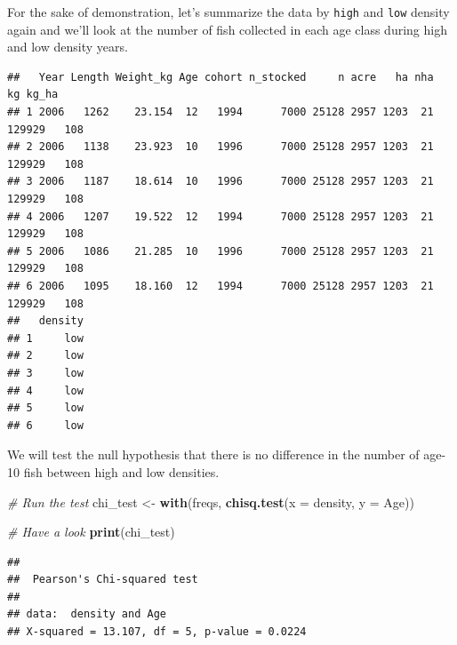 \documentclass[
]{book}
\newenvironment{Shaded}{\begin{snugshade}}{\end{snugshade}}
\newcommand{\CommentTok}[1]{\textcolor[rgb]{0.56,0.35,0.01}{\textit{#1}}}
\newcommand{\DataTypeTok}[1]{\textcolor[rgb]{0.13,0.29,0.53}{#1}}
\newcommand{\DecValTok}[1]{\textcolor[rgb]{0.00,0.00,0.81}{#1}}
\newcommand{\KeywordTok}[1]{\textcolor[rgb]{0.13,0.29,0.53}{\textbf{#1}}}
\newcommand{\NormalTok}[1]{#1}
\newcommand{\OperatorTok}[1]{\textcolor[rgb]{0.81,0.36,0.00}{\textbf{#1}}}
\newcommand{\StringTok}[1]{\textcolor[rgb]{0.31,0.60,0.02}{#1}}
\begin{document}
For the sake of demonstration, let's summarize the data by \texttt{high} and \texttt{low} density again and we'll look at the number of fish collected in each age class during high and low density years.

\begin{Shaded}
\end{Shaded}

\begin{verbatim}
##   Year Length Weight_kg Age cohort n_stocked     n acre   ha nha     kg kg_ha
## 1 2006   1262    23.154  12   1994      7000 25128 2957 1203  21 129929   108
## 2 2006   1138    23.923  10   1996      7000 25128 2957 1203  21 129929   108
## 3 2006   1187    18.614  10   1996      7000 25128 2957 1203  21 129929   108
## 4 2006   1207    19.522  12   1994      7000 25128 2957 1203  21 129929   108
## 5 2006   1086    21.285  10   1996      7000 25128 2957 1203  21 129929   108
## 6 2006   1095    18.160  12   1994      7000 25128 2957 1203  21 129929   108
##   density
## 1     low
## 2     low
## 3     low
## 4     low
## 5     low
## 6     low
\end{verbatim}

We will test the null hypothesis that there is no difference in the number of age-10 fish between high and low densities.

\begin{Shaded}
\begin{Highlighting}[]
\CommentTok{# Run the test}
\NormalTok{chi_test <-}\StringTok{ }\KeywordTok{with}\NormalTok{(freqs, }\KeywordTok{chisq.test}\NormalTok{(}\DataTypeTok{x =}\NormalTok{ density, }\DataTypeTok{y =}\NormalTok{ Age))}

\CommentTok{# Have a look}
\KeywordTok{print}\NormalTok{(chi_test)}
\end{Highlighting}
\end{Shaded}

\begin{verbatim}
## 
## 	Pearson's Chi-squared test
## 
## data:  density and Age
## X-squared = 13.107, df = 5, p-value = 0.0224
\end{verbatim}
\end{document}
